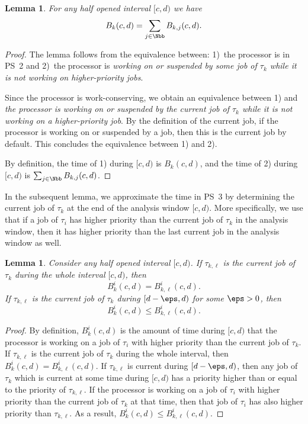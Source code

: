 \documentclass[conference]{IEEEtran}
\newtheorem{lem}[thm]{Lemma}
\theoremstyle{definition}
\theoremstyle{remark}
\begin{document}
	\begin{lem}\label{lem:refinement_Bk}
		For any half opened interval $[c,d)$ we have
		\begin{equation}
			B_k(c,d) = \sum_{j \in \Nbb} B_{k,j}(c,d).
		\end{equation}
	\end{lem}
	\begin{proof}
		The lemma follows from the equivalence between: 1)~the processor is in PS~2 and 
		2)~the processor is \emph{working on or suspended by some job of $\tau_k$ while it is not working on higher-priority jobs}.
		
		Since the processor is work-conserving, we obtain an equivalence between 1) and \emph{the processor is working on or suspended by the current job of $\tau_k$ while it is not working on a higher-priority job}.
		By the definition of the current job, if the processor is working on or suspended by a job, then this is the current job by default. 
		This concludes the equivalence between 1) and 2).
		
		By definition, the time of 1) during $[c,d)$ is $B_k(c,d)$, and the time of 2) during $[c,d)$ is $\sum_{j \in \Nbb} B_{k,j}(c,d)$.
	\end{proof}
	
	In the subsequent lemma, we approximate the time in PS~3 by determining the current job of $\tau_k$ at the end of the analysis window $[c,d)$.
	More specifically, we use that if a job of $\tau_i$ has higher priority than the current job of $\tau_k$ in the analysis window, then it has higher priority than the last current job in the analysis window as well.
	
	\begin{lem}\label{lem:refinement_Bik}
		Consider any half opened interval $[c,d)$.
		If $\tau_{k,\ell}$ is the current job of $\tau_k$ during the whole interval $[c,d)$, then
		\begin{equation}
			B^i_k(c,d) = B^i_{k,\ell}(c,d).
		\end{equation}
		If $\tau_{k,\ell}$ is the current job of $\tau_k$ during $[d-\eps, d)$ for some $\eps >0$, then
		\begin{equation}
			B^i_k(c,d) \leq B^i_{k,\ell}(c,d).
		\end{equation}
	\end{lem}
	\begin{proof}
		By definition, $B^i_k(c,d)$ is the amount of time during $[c,d)$ that the processor is working on a job of $\tau_i$ with higher priority than the current job of $\tau_k$.
		If $\tau_{k,\ell}$ is the current job of $\tau_k$ during the whole interval, then $B^i_k(c,d) = B^i_{k,\ell}(c,d)$.
		If $\tau_{k,\ell}$ is current during $[d-\eps,d)$, then any job of $\tau_k$ which is current at some time during $[c,d)$ has a priority higher than or equal to the priority of $\tau_{k,\ell}$.
		If the processor is working on a job of $\tau_i$ with higher priority than the current job of $\tau_k$ at that time, then that job of $\tau_i$ has also higher priority than $\tau_{k,\ell}$.
		As a result, $B^i_k(c,d) \leq B^i_{k,\ell}(c,d)$. 
	\end{proof}
	
\end{document}
